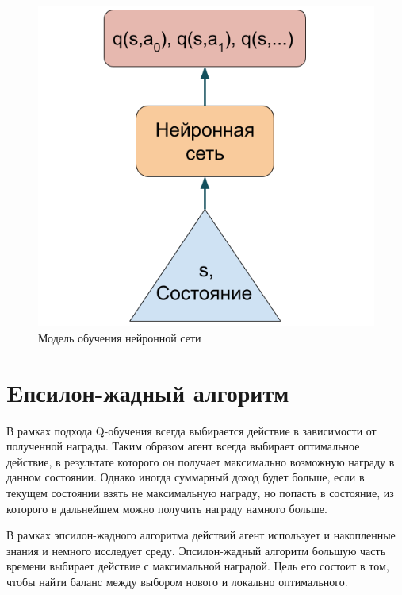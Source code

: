 \begin{figure}[h]
	\centering
	\includegraphics[scale=0.6]{q_l.png}
	\caption {Модель обучения нейронной сети}
	\label{fig:q-l}
\end{figure}
\newpage


\section{Eпсилон-жадный алгоритм}\label{1sec:optimal-control}

В рамках подхода Q-обучения всегда выбирается действие в зависимости от полученной награды. Таким образом агент всегда выбирает оптимальное действие, в результате которого он получает максимально возможную награду в данном состоянии. Однако иногда суммарный доход будет больше, если в текущем состоянии взять не максимальную награду, но попасть в состояние, из которого в дальнейшем можно получить награду намного больше.

В рамках эпсилон-жадного алгоритма действий агент использует и накопленные знания и немного исследует среду. Эпсилон-жадный алгоритм большую часть времени выбирает действие с максимальной наградой. Цель его состоит в том, чтобы найти баланс между выбором нового и локально оптимального. 

